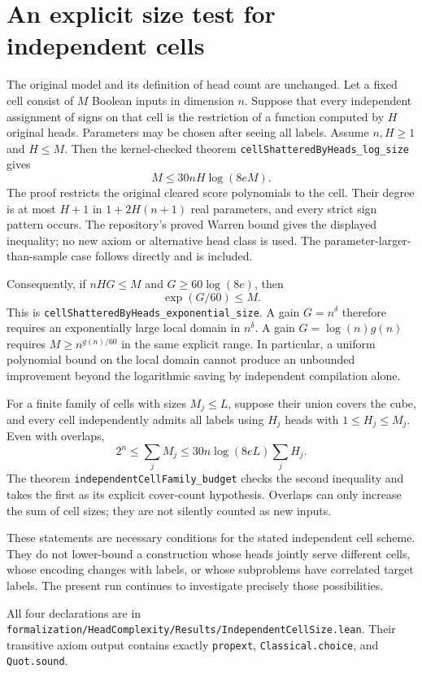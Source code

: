 \section{An explicit size test for independent cells}

The original model and its definition of head count are unchanged.
Let a fixed cell consist of $M$ Boolean inputs in dimension $n$.
Suppose that every independent assignment of signs on that cell is the
restriction of a function computed by $H$ original heads.  Parameters may
be chosen after seeing all labels.  Assume $n,H\geq1$ and $H\leq M$.
Then the kernel-checked theorem
\texttt{cellShatteredByHeads\_log\_size} gives
\[
 M\leq30nH\log(8eM).
\]
The proof restricts the original cleared score polynomials to the cell.
Their degree is at most $H+1$ in $1+2H(n+1)$ real parameters, and every
strict sign pattern occurs.  The repository's proved Warren bound gives
the displayed inequality; no new axiom or alternative head class is used.
The parameter-larger-than-sample case follows directly and is included.

Consequently, if $nHG\leq M$ and $G\geq60\log(8e)$, then
\[
 \exp(G/60)\leq M.
\]
This is \texttt{cellShatteredByHeads\_exponential\_size}.
A gain $G=n^\delta$ therefore requires an exponentially large local
domain in $n^\delta$.  A gain $G=\log(n)g(n)$ requires
$M\geq n^{g(n)/60}$ in the same explicit range.  In particular, a
uniform polynomial bound on the local domain cannot produce an
unbounded improvement beyond the logarithmic saving by independent
compilation alone.

For a finite family of cells with sizes $M_j\leq L$, suppose their union
covers the cube, and every cell independently admits all labels using
$H_j$ heads with $1\leq H_j\leq M_j$.  Even with overlaps,
\[
 2^n\leq\sum_jM_j
 \leq30n\log(8eL)\sum_jH_j.
\]
The theorem \texttt{independentCellFamily\_budget} checks the second
inequality and takes the first as its explicit cover-count hypothesis.
Overlaps can only increase the sum of cell sizes; they are not silently
counted as new inputs.

These statements are necessary conditions for the stated independent
cell scheme.  They do not lower-bound a construction whose heads jointly
serve different cells, whose encoding changes with labels, or whose
subproblems have correlated target labels.  The present run continues to
investigate precisely those possibilities.

All four declarations are in
\texttt{formalization/HeadComplexity/Results/IndependentCellSize.lean}.
Their transitive axiom output contains exactly \texttt{propext},
\texttt{Classical.choice}, and \texttt{Quot.sound}.
